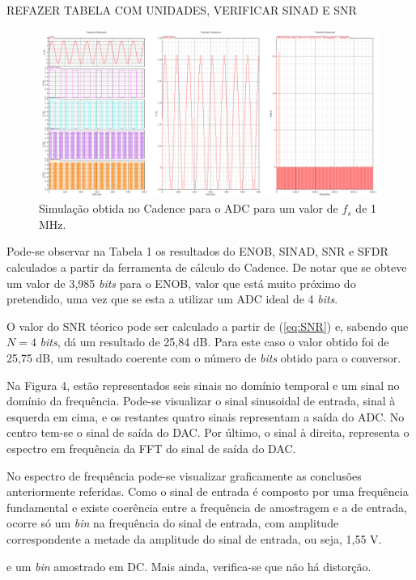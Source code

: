 \documentclass[11pt]{article}
\numberwithin{equation}{section}
\begin{document}
REFAZER TABELA COM UNIDADES, VERIFICAR SINAD E SNR

\begin{figure}[H]
	\centering
	\includegraphics[keepaspectratio=true, scale=0.32]{lab/f_fft_1M.png}
	\caption{Simulação obtida no Cadence para o ADC para um valor de $f_{s}$ de 1 MHz.}
	\vspace{-0.8em}
\end{figure}
	 
Pode-se observar na Tabela 1 os resultados do ENOB, SINAD, SNR e SFDR calculados a partir da ferramenta de cálculo do Cadence. De notar que se obteve um valor de 3,985 \textit{bits} para o ENOB, valor que está muito próximo do pretendido, uma vez que se esta a utilizar um ADC ideal de 4 \textit{bits}.

O valor do SNR téorico pode ser calculado a partir de (\ref{eq:SNR}) e, sabendo que $N = 4$ \textit{bits}, dá um resultado de 25,84 dB. Para este caso o valor obtido foi de 25,75 dB, um resultado coerente com o número de \textit{bits} obtido para o conversor. 	 
	 
Na Figura 4, estão representados seis sinais no domínio temporal e um sinal no domínio da frequência. Pode-se visualizar o sinal sinusoidal de entrada, sinal à esquerda em cima, e os restantes quatro sinais representam a saída do ADC. No centro tem-se o sinal de saída do DAC. Por último, o sinal à direita, representa o espectro em frequência da FFT do sinal de saída do DAC.

No espectro de frequência pode-se visualizar graficamente as conclusões anteriormente referidas. Como o sinal de entrada é composto por uma frequência fundamental e existe coerência entre a frequência de amostragem e a de entrada, ocorre só um \textit{bin} na frequência do sinal de entrada, com amplitude correspondente a metade da amplitude do sinal de entrada, ou seja, 1,55 V.

e um \textit{bin} amostrado em DC. Mais ainda, verifica-se que não há distorção.
\end{document}
